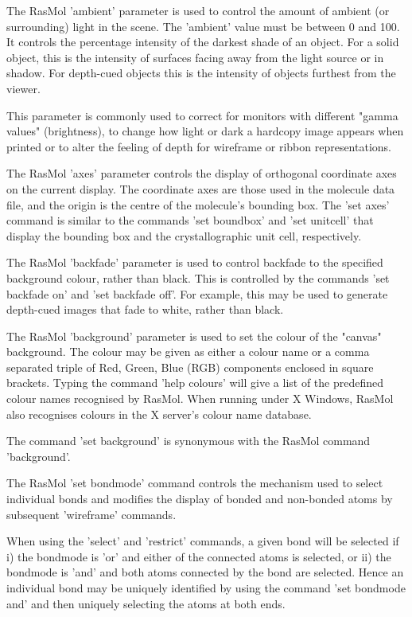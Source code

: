 The RasMol
'ambient'
parameter is used to control the amount of ambient (or surrounding)
light in the scene. The
'ambient'
value must be between 0 and 100. It controls the percentage intensity
of the darkest shade of an object. For a solid object, this is the
intensity of surfaces facing away from the light source or in shadow.
For depth-cued objects this is the intensity of objects furthest from
the viewer.

This parameter is commonly used to correct for monitors with different
"gamma values" (brightness), to change how light or dark a hardcopy
image appears when printed or to alter the feeling of depth for
wireframe or ribbon representations.

The RasMol
'axes'
parameter controls the display of orthogonal coordinate axes on
the current display. The coordinate axes are those used in the
molecule data file, and the origin is the centre of the molecule's
bounding box. The
'set axes'
command is similar to the commands
'set boundbox'
and
'set unitcell'
that display the bounding box and the crystallographic unit cell,
respectively.

The RasMol
'backfade'
parameter is used to control backfade to the specified background
colour, rather than black.  This is controlled by the commands
'set backfade on'
and
'set backfade off'.
For example, this may be used to generate depth-cued images that
fade to white, rather than black.

The RasMol
'background'
parameter is used to set the colour of the "canvas" background. The
colour may be given as either a colour name or a comma separated
triple of Red, Green, Blue (RGB) components enclosed in square
brackets. Typing the command
'help colours'
will give a list of the predefined colour names recognised by RasMol.
When running under X Windows, RasMol also recognises colours in the
X server's colour name database.

The command
'set background'
is synonymous with the RasMol command
'background'.

The RasMol
'set bondmode'
command controls the mechanism used to select individual bonds
and modifies the display of bonded and non-bonded atoms by subsequent
'wireframe'
commands.

When using the
'select'
and
'restrict'
commands, a given bond will be selected if i) the bondmode is
'or'
and either of the connected atoms is selected, or ii) the bondmode is
'and'
and both atoms connected by the bond are selected. Hence an individual
bond may be uniquely identified by using the command
'set bondmode and'
and then uniquely selecting the atoms at both ends.

